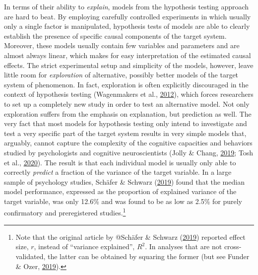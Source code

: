 \documentclass[11pt,american,]{memoir} %
\let\rmarkdownfootnote\footnote%
\def\footnote{\protect\rmarkdownfootnote}
\begin{document}
In terms of their ability to \emph{explain}, models from the hypothesis testing approach are hard to beat. By employing carefully controlled experiments in which usually only a single factor is manipulated, hypothesis tests of models are able to clearly establish the presence of specific causal components of the target system. Moreover, these models usually contain few variables and parameters and are almost always linear, which makes for easy interpretation of the estimated causal effects. The strict experimental setup and simplicity of the models, however, leave little room for \emph{exploration} of alternative, possibly better models of the target system of phenomenon. In fact, exploration is often explicitly discouraged in the context of hypothesis testing (Wagenmakers et al., \protect\hyperlink{ref-Wagenmakers2012-vd}{2012}), which forces researchers to set up a completely new study in order to test an alternative model. Not only exploration suffers from the emphasis on explanation, but prediction as well. The very fact that most models for hypothesis testing only intend to investigate and test a very specific part of the target system results in very simple models that, arguably, cannot capture the complexity of the cognitive capacities and behaviors studied by psychologists and cognitive neuroscientists (Jolly \& Chang, \protect\hyperlink{ref-Jolly2019-lx}{2019}; Tosh et al., \protect\hyperlink{ref-Tosh2020-sf}{2020}). The result is that each individual model is usually only able to correctly \emph{predict} a fraction of the variance of the target variable. In a large sample of psychology studies, Schäfer \& Schwarz (\protect\hyperlink{ref-Schafer2019-ue}{2019}) found that the median model performance, expressed as the proportion of explained variance of the target variable, was only 12.6\% and was found to be as low as 2.5\% for purely confirmatory and preregistered studies.\footnote{Note that the original article by @Schäfer \& Schwarz (\protect\hyperlink{ref-Schafer2019-ue}{2019}) reported effect size, \(r\), instead of ``variance explained'', \(R^{2}\). In analyses that are not cross-validated, the latter can be obtained by squaring the former (but see Funder \& Ozer, \protect\hyperlink{ref-Funder2019-ow}{2019}).}
\end{document}
